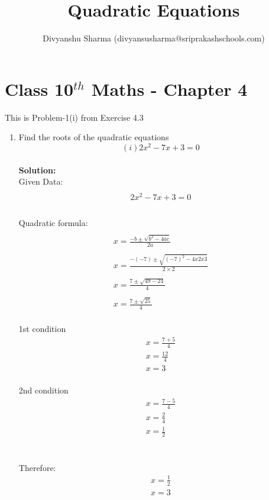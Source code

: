 \documentclass[12pt]{article}
\title{Quadratic Equations}
\author{Divyanshu Sharma (divyansusharma@sriprakashschools.com)}
\newcommand{\solution}{\noindent \textbf{Solution: }}
\begin{document}
\maketitle
\section*{Class 10$^{th}$ Maths - Chapter 4}
This is Problem-1(i) from Exercise 4.3
\begin{enumerate}
\item   Find the roots of the quadratic equations  
$$(i)2{x^2} - 7x + 3 = 0$$\\
\solution \\
Given Data:
\begin{align}
\\{2x^2- 7x + 3 = 0}\\
\end{align}
\\ Quadratic formula:
\begin{align}
\\{x=\frac{-b\pm\sqrt{b^2-4ac}}{2a}}\\
\\{x=\frac{-(-7)\pm\sqrt{(-7)^2-4x2x3 }}{2 \times 2}}\\
\\{x=\frac{7\pm\sqrt{49 - 24}}{4}}\\
\\{x=\frac{7\pm\sqrt{25}}{4}}\\
\end{align}

1st condition
\begin{align}
{x=\frac{7+5}{4}}\\
{x=\frac{12}{4}}\\
{x=3}\\
\end{align}

2nd condition
\begin{align}
{x=\frac{7-5}{4}}\\
{x=\frac{2}{4}}\\
{x=\frac{1}{2}}\\
\end{align}

\\Therefore:
\begin{align}
    x=\frac{1}{2}\\
    x= 3
\end{align}

\end{enumerate}
\end{document}
